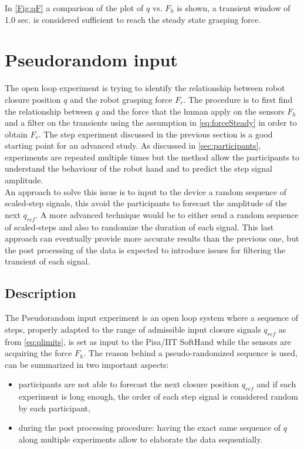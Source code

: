 In \ref{Fig:qF} a comparison of the plot of $q$ vs. $F_{h}$ is shown, a transient window of 1.0 sec. is considered sufficient to reach the steady state grasping force. 


\section{Pseudorandom input}\label{sec:pseudo}
The open loop experiment is trying to identify the relationship between robot closure position $q$ and the robot grasping force $F_{r}$. The procedure is to first find the relationship between $q$ and the force that the human apply on the sensors $F_{h}$ and a filter on the transients using the assumption in \eqref{eq:forceSteady} in order to obtain $F_{r}$. 
The step experiment discussed in the previous section is a good starting point for an advanced study. 
As discussed in \ref{sec:participants}, experiments are repeated multiple times but the method allow the participants to understand the behaviour of the robot hand and to predict the step signal amplitude. \\
An approach to solve this issue is to input to the device a random sequence of scaled-step signals, this avoid the participants to forecast the amplitude of the next $q_{ref}$. A more advanced technique would be to either send a random sequence of scaled-steps and also to randomize the duration of each signal. This last approach can eventually provide more accurate results than the previous one, but the post processing of the data is expected to introduce issues for filtering the transient of each signal.
%
\subsection{Description}
The Pseudorandom input experiment is an open loop system where a sequence of steps, properly adapted to the range of admissible input closure signals $q_{ref}$ as from \eqref{eq:qlimits}, is set as input to the Pisa/IIT SoftHand while the sensors are acquiring the force $F_{h}$.
The reason behind a pseudo-randomized sequence is used, can be summarized in two important aspects:
\begin{itemize}
\item participants are not able to forecast the next closure position $q_{ref}$ and if each experiment is long enough, the order of each step signal is considered random by each participant,
\item during the post processing procedure: having the exact same sequence of $q$ along multiple experiments allow to elaborate the data sequentially.
\end{itemize}

